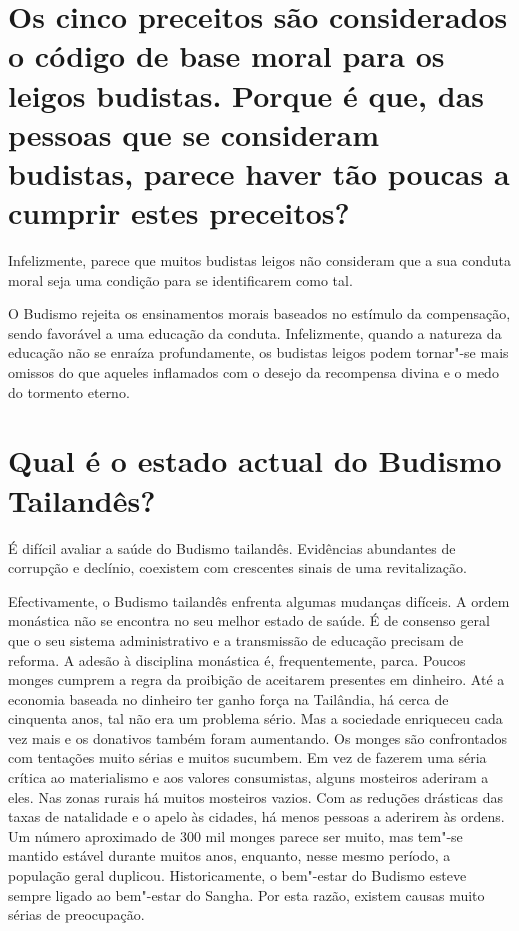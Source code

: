 \section{Os cinco preceitos são considerados o código de base moral para os
  leigos budistas. Porque é que, das pessoas que se consideram budistas, parece
  haver tão poucas a cumprir estes preceitos?}

Infelizmente, parece que muitos budistas leigos não consideram que a sua
conduta moral seja uma condição para se identificarem como tal.

O Budismo rejeita os ensinamentos morais baseados no estímulo da
compensação, sendo favorável a uma educação da conduta. Infelizmente,
quando a natureza da educação não se enraíza profundamente, os budistas
leigos podem tornar"-se mais omissos do que aqueles inflamados com o
desejo da recompensa divina e o medo do tormento eterno.

\section{Qual é o estado actual do Budismo Tailandês?}

É difícil avaliar a saúde do Budismo tailandês. Evidências abundantes de
corrupção e declínio, coexistem com crescentes sinais de uma
revitalização.

Efectivamente, o Budismo tailandês enfrenta algumas mudanças difíceis. A
ordem monástica não se encontra no seu melhor estado de saúde. É de
consenso geral que o seu sistema administrativo e a transmissão de
educação precisam de reforma. A adesão à disciplina monástica é,
frequentemente, parca. Poucos monges cumprem a regra da proibição de
aceitarem presentes em dinheiro. Até a economia baseada no dinheiro ter
ganho força na Tailândia, há cerca de cinquenta anos, tal não era um
problema sério. Mas a sociedade enriqueceu cada vez mais e os donativos
também foram aumentando. Os monges são confrontados com tentações muito
sérias e muitos sucumbem. Em vez de fazerem uma séria crítica ao
materialismo e aos valores consumistas, alguns mosteiros aderiram a
eles. Nas zonas rurais há muitos mosteiros vazios. Com as reduções
drásticas das taxas de natalidade e o apelo às cidades, há menos pessoas
a aderirem às ordens. Um número aproximado de 300 mil monges parece ser
muito, mas tem"-se mantido estável durante muitos anos, enquanto, nesse
mesmo período, a população geral duplicou. Historicamente, o bem"-estar
do Budismo esteve sempre ligado ao bem"-estar do Sangha. Por esta razão,
existem causas muito sérias de preocupação.

